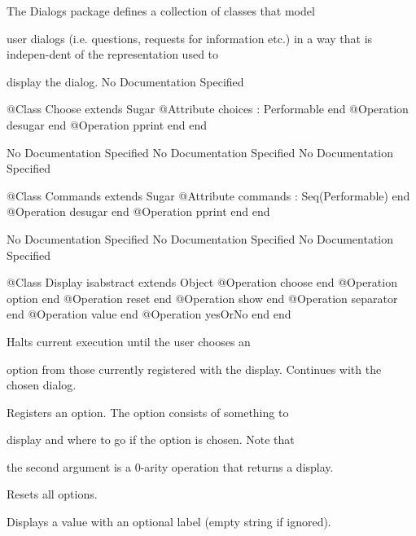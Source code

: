       The Dialogs package defines a collection of classes that model

      user dialogs (i.e. questions, requests for information etc.)
      in a way that is indepen-dent of the representation used to

      display the dialog.
No Documentation Specified
\begin{Interface}
@Class Choose extends Sugar
  @Attribute choices : Performable end
  @Operation desugar end
  @Operation pprint end
end
\end{Interface}
No Documentation Specified
No Documentation Specified
No Documentation Specified
\begin{Interface}
@Class Commands extends Sugar
  @Attribute commands : Seq(Performable) end
  @Operation desugar end
  @Operation pprint end
end
\end{Interface}
No Documentation Specified
No Documentation Specified
No Documentation Specified
\begin{Interface}
@Class Display isabstract extends Object
  @Operation choose end
  @Operation option end
  @Operation reset end
  @Operation show end
  @Operation separator end
  @Operation value end
  @Operation yesOrNo end
end
\end{Interface}

        Halts current execution until the user chooses an

        option from those currently registered with the display.
        Continues with the chosen dialog.

        Registers an option. The option consists of something to

        display and where to go if the option is chosen. Note that

        the second argument is a 0-arity operation that returns a 
        display.

        Resets all options.

        Displays a value with an optional label (empty string if ignored).

